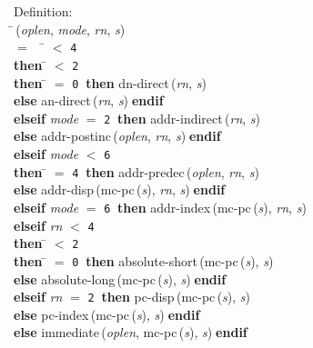 \begin{tabbing}{\sc Definition}: \\  
\=\,({\it{oplen\/}}, {\it{mode\/}}, {\it{rn\/}}, {\it{s\/}}) \\ 
$=$$\;\;\;\;$\= $<$ {\tt{4}} \\ 
{\bf then }\= $<$ {\tt{2}} \\ 
{\bf then }\= $=$ {\tt{0}}$\;\;${\bf then }{\rm{dn-direct}}\,({\it{rn\/}}, {\it{s\/}}) \\ 
{\bf else }{\rm{an-direct}}\,({\it{rn\/}}, {\it{s\/}})$\;${\bf  endif}\- \\ 
{\bf elseif }{\it{mode\/}} $=$ {\tt{2}}$\;\;${\bf then }{\rm{addr-indirect}}\,({\it{rn\/}}, {\it{s\/}}) \\ 
{\bf else }{\rm{addr-postinc}}\,({\it{oplen\/}}, {\it{rn\/}}, {\it{s\/}})$\;${\bf  endif}\- \\ 
{\bf elseif }{\it{mode\/}} $<$ {\tt{6}} \\ 
{\bf then }\= $=$ {\tt{4}}$\;\;${\bf then }{\rm{addr-predec}}\,({\it{oplen\/}}, {\it{rn\/}}, {\it{s\/}}) \\ 
{\bf else }{\rm{addr-disp}}\,({\rm{mc-pc}}\,({\it{s\/}}), {\it{rn\/}}, {\it{s\/}})$\;${\bf  endif}\- \\ 
{\bf elseif }{\it{mode\/}} $=$ {\tt{6}}$\;\;${\bf then }{\rm{addr-index}}\,({\rm{mc-pc}}\,({\it{s\/}}), {\it{rn\/}}, {\it{s\/}}) \\ 
{\bf elseif }{\it{rn\/}} $<$ {\tt{4}} \\ 
{\bf then }\= $<$ {\tt{2}} \\ 
{\bf then }\= $=$ {\tt{0}}$\;\;${\bf then }{\rm{absolute-short}}\,({\rm{mc-pc}}\,({\it{s\/}}), {\it{s\/}}) \\ 
{\bf else }{\rm{absolute-long}}\,({\rm{mc-pc}}\,({\it{s\/}}), {\it{s\/}})$\;${\bf  endif}\- \\ 
{\bf elseif }{\it{rn\/}} $=$ {\tt{2}}$\;\;${\bf then }{\rm{pc-disp}}\,({\rm{mc-pc}}\,({\it{s\/}}), {\it{s\/}}) \\ 
{\bf else }{\rm{pc-index}}\,({\rm{mc-pc}}\,({\it{s\/}}), {\it{s\/}})$\;${\bf  endif}\- \\ 
{\bf else }{\rm{immediate}}\,({\it{oplen\/}}, {\rm{mc-pc}}\,({\it{s\/}}), {\it{s\/}})$\;${\bf  endif}\-\-
\end{tabbing}

